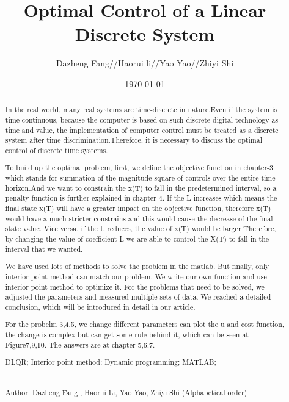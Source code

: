 \documentclass{mcmthesis}
\title{\large Optimal Control of a Linear Discrete System}
\author{Dazheng Fang//Haorui li//Yao Yao//Zhiyi Shi }
\date{\today}
\begin{document}
\begin{abstract}

In the real world, many real systems are time-discrete in nature.Even if the system is time-continuous, because the computer is based on such discrete digital technology as time and value, the implementation of computer control must be treated as a discrete system after time discrimination.Therefore, it is necessary to discuss the optimal control of discrete time systems.

To build up the optimal problem, first, we define the objective function in chapter-3 which stands for summation of the magnitude square of controls over the entire time horizon.And we want to constrain the x(T) to fall in the predetermined interval, so a penalty function is further explained in chapter-4. If the L increases which means the final state x(T) will have a greater impact on the objective function, therefore x(T) would have a much stricter constrains and this would cause the decrease of the final state value. Vice versa, if the L reduces, the value of x(T) would be larger
Therefore, by changing the value of coefficient L we are able to control the X(T) to fall in the interval that we wanted.

We have used lots of methods to solve the problem in the matlab. But finally, only interior point method can match our problem. We write our own function and use interior point method to optimize it. For the problems that need to be solved, we adjusted the parameters and measured multiple sets of data. We reached a detailed conclusion, which will be introduced in detail in our article.

For the probelm 3,4,5, we change different parameters can plot the u and cost function, the change is complex but can get some rule behind it, which can be seen at Figure7,9,10. The answers are at chapter 5,6,7.



\begin{keywords}
DLQR; Interior point method;  Dynamic programming; MATLAB; \\\\\\
Author: Dazheng Fang , Haorui Li, Yao Yao, Zhiyi Shi (Alphabetical order)
\end{keywords}


\end{abstract}
\maketitle
\newpage                                                          %
\begin{adjustwidth}{-1cm}{0cm}

\setcounter{tocdepth}{3}
\thispagestyle{empty}
\tableofcontents                                                  %

\end{adjustwidth}
\end{document}
